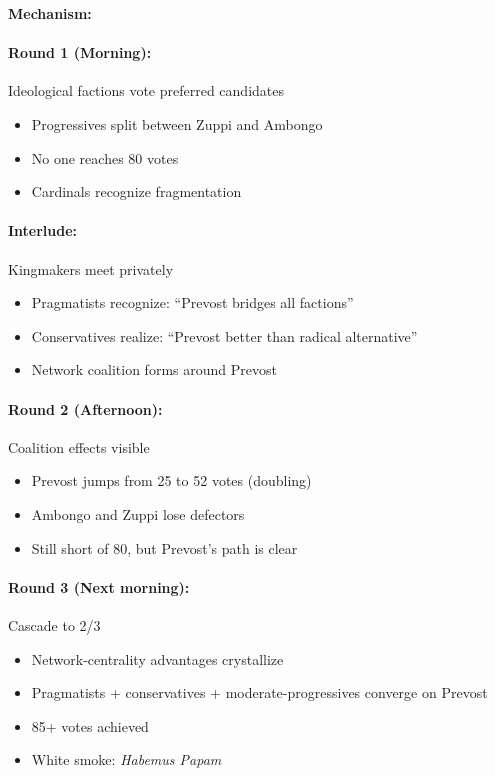 \documentclass[11pt]{article}
\begin{document}
\textbf{Mechanism:}

\paragraph{Round 1 (Morning):} Ideological factions vote preferred candidates
\begin{itemize}
\item Progressives split between Zuppi and Ambongo
\item No one reaches 80 votes
\item Cardinals recognize fragmentation
\end{itemize}

\paragraph{Interlude:} Kingmakers meet privately
\begin{itemize}
\item Pragmatists recognize: ``Prevost bridges all factions''
\item Conservatives realize: ``Prevost better than radical alternative''
\item Network coalition forms around Prevost
\end{itemize}

\paragraph{Round 2 (Afternoon):} Coalition effects visible
\begin{itemize}
\item Prevost jumps from 25 to 52 votes (doubling)
\item Ambongo and Zuppi lose defectors
\item Still short of 80, but Prevost's path is clear
\end{itemize}

\paragraph{Round 3 (Next morning):} Cascade to 2/3
\begin{itemize}
\item Network-centrality advantages crystallize
\item Pragmatists + conservatives + moderate-progressives converge on Prevost
\item 85+ votes achieved
\item White smoke: \textit{Habemus Papam}
\end{itemize}
\end{document}
